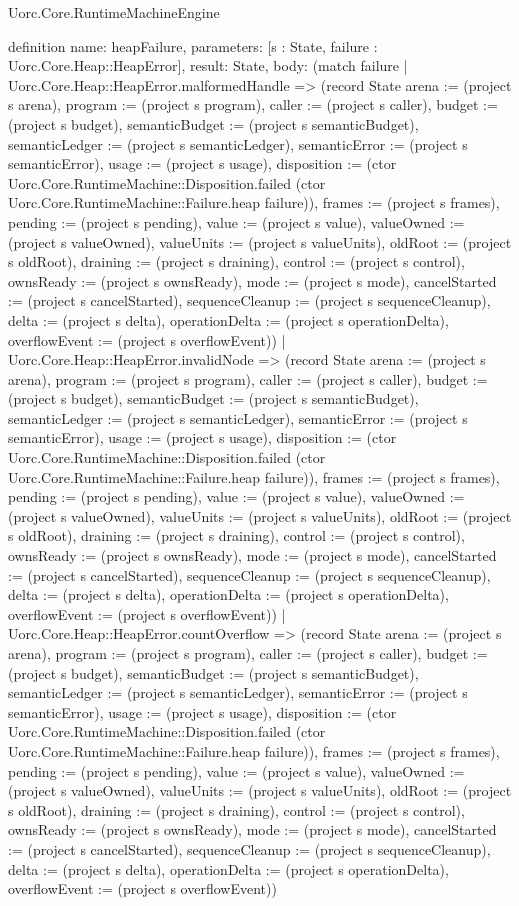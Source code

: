 \begin{lexlean}{Uorc.Core.RuntimeMachineEngine}
\begin{semanticmodule}
definition{
  name: heapFailure,
  parameters: [s : State, failure : Uorc.Core.Heap::HeapError],
  result: State,
  body: (match failure
    | Uorc.Core.Heap::HeapError.malformedHandle => (record State {arena := (project s arena), program := (project s program), caller := (project s caller), budget := (project s budget), semanticBudget := (project s semanticBudget), semanticLedger := (project s semanticLedger), semanticError := (project s semanticError), usage := (project s usage), disposition := (ctor Uorc.Core.RuntimeMachine::Disposition.failed (ctor Uorc.Core.RuntimeMachine::Failure.heap failure)), frames := (project s frames), pending := (project s pending), value := (project s value), valueOwned := (project s valueOwned), valueUnits := (project s valueUnits), oldRoot := (project s oldRoot), draining := (project s draining), control := (project s control), ownsReady := (project s ownsReady), mode := (project s mode), cancelStarted := (project s cancelStarted), sequenceCleanup := (project s sequenceCleanup), delta := (project s delta), operationDelta := (project s operationDelta), overflowEvent := (project s overflowEvent)})
    | Uorc.Core.Heap::HeapError.invalidNode => (record State {arena := (project s arena), program := (project s program), caller := (project s caller), budget := (project s budget), semanticBudget := (project s semanticBudget), semanticLedger := (project s semanticLedger), semanticError := (project s semanticError), usage := (project s usage), disposition := (ctor Uorc.Core.RuntimeMachine::Disposition.failed (ctor Uorc.Core.RuntimeMachine::Failure.heap failure)), frames := (project s frames), pending := (project s pending), value := (project s value), valueOwned := (project s valueOwned), valueUnits := (project s valueUnits), oldRoot := (project s oldRoot), draining := (project s draining), control := (project s control), ownsReady := (project s ownsReady), mode := (project s mode), cancelStarted := (project s cancelStarted), sequenceCleanup := (project s sequenceCleanup), delta := (project s delta), operationDelta := (project s operationDelta), overflowEvent := (project s overflowEvent)})
    | Uorc.Core.Heap::HeapError.countOverflow => (record State {arena := (project s arena), program := (project s program), caller := (project s caller), budget := (project s budget), semanticBudget := (project s semanticBudget), semanticLedger := (project s semanticLedger), semanticError := (project s semanticError), usage := (project s usage), disposition := (ctor Uorc.Core.RuntimeMachine::Disposition.failed (ctor Uorc.Core.RuntimeMachine::Failure.heap failure)), frames := (project s frames), pending := (project s pending), value := (project s value), valueOwned := (project s valueOwned), valueUnits := (project s valueUnits), oldRoot := (project s oldRoot), draining := (project s draining), control := (project s control), ownsReady := (project s ownsReady), mode := (project s mode), cancelStarted := (project s cancelStarted), sequenceCleanup := (project s sequenceCleanup), delta := (project s delta), operationDelta := (project s operationDelta), overflowEvent := (project s overflowEvent)})
}
\end{semanticmodule}
\end{lexlean}
